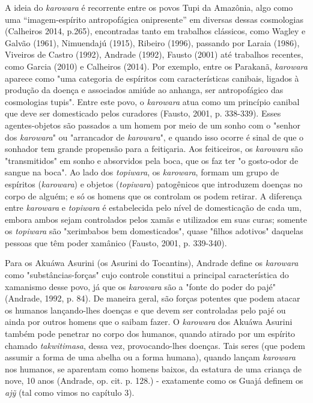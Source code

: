 A ideia do \emph{karowara} é recorrente entre os povos Tupi da Amazônia,
algo como uma ``imagem-espírito antropofágica onipresente'' em diversas
dessas cosmologias (Calheiros 2014, p.265), encontradas tanto em
trabalhos clássicos, como Wagley e Galvão (1961), Nimuendajú (1915),
Ribeiro (1996), passando por Laraia (1986), Viveiros de Castro (1992),
Andrade (1992), Fausto (2001) até trabalhos recentes, como Garcia (2010)
e Calheiros (2014). Por exemplo, entre os Parakanã, \emph{karowara}
aparece como "uma categoria de espíritos com características canibais,
ligados à produção da doença e associados amiúde ao anhanga, ser
antropofágico das cosmologias tupis". Entre este povo, o \emph{karowara}
atua como um princípio canibal que deve ser domesticado pelos curadores
(Fausto, 2001, p. 338-339). Esses agentes-objetos são passados a um
homem por meio de um sonho com o "senhor dos \emph{karowara}" ou
"arrancador de \emph{karowara}", e quando isso ocorre é sinal de que o
sonhador tem grande propensão para a feitiçaria. Aos feiticeiros, os
\emph{karowara} são "transmitidos" em sonho e absorvidos pela boca, que
os faz ter "o gosto-odor de sangue na boca". Ao lado dos
\emph{topiwara}, os \emph{karowara}, formam um grupo de espíritos
(\emph{karowara}) e objetos (\emph{topiwara}) patogênicos que introduzem
doenças no corpo de alguém; e só os homens que os controlam os podem
retirar. A diferença entre \emph{karowara} e \emph{topiwara} é
estabelecida pelo nível de domesticação de cada um, embora ambos sejam
controlados pelos xamãs e utilizados em suas curas; somente os
\emph{topiwara} são "xerimbabos bem domesticados", quase "filhos
adotivos" daquelas pessoas que têm poder xamânico (Fausto, 2001, p.
339-340).

Para os Akuáwa Asurini (os Asurini do Tocantins), Andrade define os
\emph{karowara} como "substâncias-forças" cujo controle constitui a
principal característica do xamanismo desse povo, já que os
\emph{karowara} são a "fonte do poder do pajé" (Andrade, 1992, p. 84).
De maneira geral, são forças potentes que podem atacar os humanos
lançando-lhes doenças e que devem ser controladas pelo pajé ou ainda por
outros homens que o saibam fazer. O \emph{karowara} dos Akuáwa Asurini
também pode penetrar no corpo dos humanos, quando atirado por um
espírito chamado \emph{takwitimasa}, dessa vez, provocando-lhes doenças.
Tais seres (que podem assumir a forma de uma abelha ou a forma humana),
quando lançam \emph{karowara} nos humanos, se aparentam como homens
baixos, da estatura de uma criança de nove, 10 anos (Andrade, op. cit.
p. 128.) - exatamente como os Guajá definem os \emph{ajỹ} (tal como
vimos no capítulo 3).

